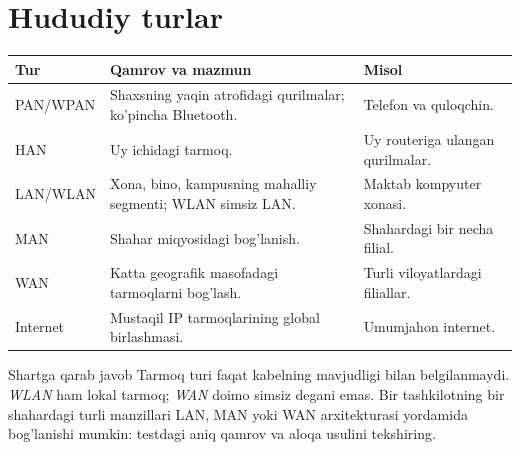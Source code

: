 \documentclass[11pt,a4paper,oneside]{book}
\begin{document}
\section{Hududiy turlar}
\par\medskip
\par\medskip
\begin{tabularx}{\textwidth}{p{}Y p{.27\textwidth}}\toprule
Tur & Qamrov va mazmun & Misol\\\midrule
PAN/WPAN & Shaxsning yaqin atrofidagi qurilmalar; ko'pincha Bluetooth. & Telefon va quloqchin.\\
HAN & Uy ichidagi tarmoq. & Uy routeriga ulangan qurilmalar.\\
LAN/WLAN & Xona, bino, kampusning mahalliy segmenti; WLAN simsiz LAN. & Maktab kompyuter xonasi.\\
MAN & Shahar miqyosidagi bog'lanish. & Shahardagi bir necha filial.\\
WAN & Katta geografik masofadagi tarmoqlarni bog'lash. & Turli viloyatlardagi filiallar.\\
Internet & Mustaqil IP tarmoqlarining global birlashmasi. & Umumjahon internet.\\\bottomrule\end{tabularx}
\begin{caution}{Shartga qarab javob}
Tarmoq turi faqat kabelning mavjudligi bilan belgilanmaydi. \emph{WLAN} ham lokal tarmoq; \emph{WAN} doimo simsiz degani emas. Bir tashkilotning bir shahardagi turli manzillari LAN, MAN yoki WAN arxitekturasi yordamida bog'lanishi mumkin: testdagi aniq qamrov va aloqa usulini tekshiring.
\end{caution}
\end{document}
